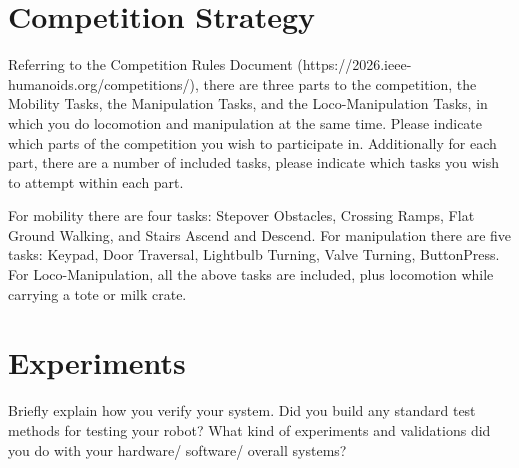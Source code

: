 \documentclass[journal]{IEEEtran}
\begin{document}
\section{Competition Strategy}
Referring to the Competition Rules Document (https://2026.ieee-humanoids.org/competitions/), there are three parts to the competition, the Mobility Tasks, the Manipulation Tasks, and the Loco-Manipulation Tasks, in which you do locomotion and manipulation at the same time. Please indicate which parts of the competition you wish to participate in. Additionally for each part, there are a number of included tasks, please indicate which tasks you wish to attempt within each part. 

For mobility there are four tasks: Stepover Obstacles, Crossing Ramps, Flat Ground Walking, and Stairs Ascend and Descend. For manipulation there are five tasks: Keypad, Door Traversal, Lightbulb Turning, Valve Turning, ButtonPress. For Loco-Manipulation, all the above tasks are included, plus locomotion while carrying a tote or milk crate. 

\section{Experiments}
Briefly explain how you verify your system. Did you build any standard test methods for testing your robot? What kind of experiments and validations did you do with your hardware/ software/ overall systems?


%
%
\end{document}
